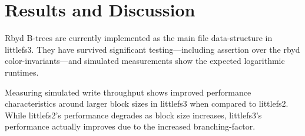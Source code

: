 \documentclass[letterpaper,twocolumn,10pt]{article}
\def\lfsiii+{avianfs}
\def\lfsiii+{littlefs3}
\def\lfsii+{littlefs2}
\begin{document}


%
%

% 

\section{Results and Discussion}
\label{sec:results}
\label{sec:discussion}

Rbyd B-trees are currently implemented as
the main file data-structure in
\lfsiii+. They have survived significant testing---including assertion
over the rbyd color-invariants---and simulated measurements show the
expected logarithmic runtimes.

Measuring simulated
write throughput shows improved performance
characteristics around larger block sizes in \lfsiii+ when compared to
\lfsii+.
While \lfsii+'s performance degrades as block size increases, \lfsiii+'s
performance actually improves due to the increased branching-factor.
\end{document}
